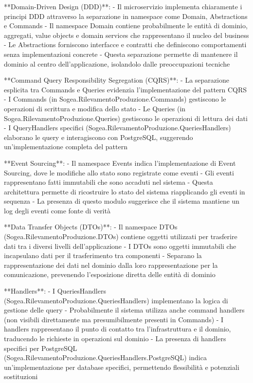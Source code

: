 **Domain-Driven Design (DDD)**:
- Il microservizio implementa chiaramente i principi DDD attraverso la separazione in namespace come Domain, Abstractions e Commands
- Il namespace Domain contiene probabilmente le entità di dominio, aggregati, value objects e domain services che rappresentano il nucleo del business
- Le Abstractions forniscono interfacce e contratti che definiscono comportamenti senza implementazioni concrete
- Questa separazione permette di mantenere il dominio al centro dell'applicazione, isolandolo dalle preoccupazioni tecniche

**Command Query Responsibility Segregation (CQRS)**:
- La separazione esplicita tra Commands e Queries evidenzia l'implementazione del pattern CQRS
- I Commands (in Sogea.RilevamentoProduzione.Commands) gestiscono le operazioni di scrittura e modifica dello stato
- Le Queries (in Sogea.RilevamentoProduzione.Queries) gestiscono le operazioni di lettura dei dati
- I QueryHandlers specifici (Sogea.RilevamentoProduzione.QueriesHandlers) elaborano le query e interagiscono con PostgreSQL, suggerendo un'implementazione completa del pattern

**Event Sourcing**:
- Il namespace Events indica l'implementazione di Event Sourcing, dove le modifiche allo stato sono registrate come eventi
- Gli eventi rappresentano fatti immutabili che sono accaduti nel sistema
- Questa architettura permette di ricostruire lo stato del sistema riapplicando gli eventi in sequenza
- La presenza di questo modulo suggerisce che il sistema mantiene un log degli eventi come fonte di verità

**Data Transfer Objects (DTOs)**:
- Il namespace DTOs (Sogea.RilevamentoProduzione.DTOs) contiene oggetti utilizzati per trasferire dati tra i diversi livelli dell'applicazione
- I DTOs sono oggetti immutabili che incapsulano dati per il trasferimento tra componenti
- Separano la rappresentazione dei dati nel dominio dalla loro rappresentazione per la comunicazione, prevenendo l'esposizione diretta delle entità di dominio

**Handlers**:
- I QueriesHandlers (Sogea.RilevamentoProduzione.QueriesHandlers) implementano la logica di gestione delle query
- Probabilmente il sistema utilizza anche command handlers (non visibili direttamente ma presumibilmente presenti in Commands)
- I handlers rappresentano il punto di contatto tra l'infrastruttura e il dominio, traducendo le richieste in operazioni sul dominio
- La presenza di handlers specifici per PostgreSQL (Sogea.RilevamentoProduzione.QueriesHandlers.PostgreSQL) indica un'implementazione per database specifici, permettendo flessibilità e potenziali sostituzioni

